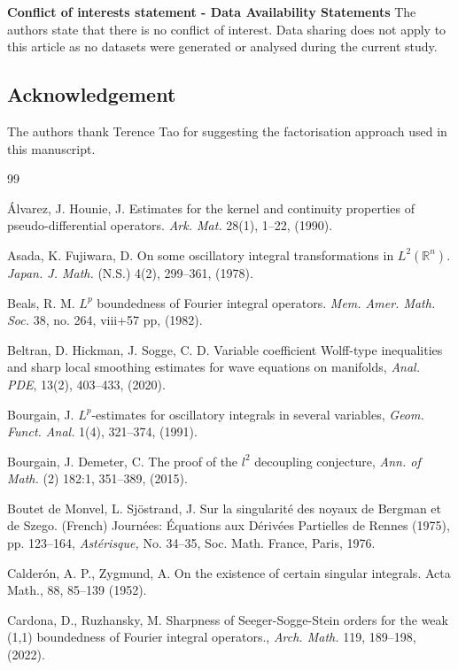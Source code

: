 \documentclass[12pt, reqno]{amsart}
\theoremstyle{definition}
\theoremstyle{remark}
\numberwithin{equation}{section}
\begin{document}
\noindent\textbf{Conflict of interests statement - Data Availability Statements}  The authors state that there is no conflict of interest.  Data sharing does not apply to this article as no datasets were generated or
analysed during the current study.
\subsection{Acknowledgement} The authors thank Terence Tao for suggesting the factorisation approach used in this manuscript.





 

 \begin{thebibliography}{99}

  \'Alvarez, J.   Hounie, J. Estimates for the kernel and continuity properties of pseudo-differential operators. {\it Ark. Mat.} 28(1), 1--22, (1990). 

 Asada, K. Fujiwara, D. On some oscillatory integral transformations in $L^2(\mathbb{R}^n).$  {\it Japan. J. Math.} (N.S.) 4(2), 299--361, (1978).

  Beals, R. M. $L^p$ boundedness of Fourier integral operators. {\it Mem. Amer. Math. Soc.} 38, no. 264, viii+57 pp, (1982).

 Beltran, D.  Hickman, J. Sogge, C. D. Variable coefficient Wolff-type inequalities and sharp local smoothing estimates for wave equations on manifolds, {\it Anal. PDE}, 13(2), 403--433, (2020).

 Bourgain, J.  $L^p$-estimates for oscillatory integrals in several variables, {\it Geom. Funct. Anal.} 1(4), 321--374, (1991). 

 Bourgain, J. Demeter, C. The proof of the $l^2$ decoupling conjecture, {\it Ann. of Math.} (2) 182:1, 351--389, (2015). 

 Boutet de Monvel, L. Sj\"ostrand, J.
Sur la singularité des noyaux de Bergman et de Szego. (French) Journées: Équations aux Dérivées Partielles de Rennes (1975), pp. 123--164,
{\it Ast\'erisque,} No. 34--35, Soc. Math. France, Paris, 1976. 

 Calder\'on, A. P., Zygmund, A. On the existence of certain singular integrals. Acta Math., 88, 85--139
(1952). 

 Cardona, D., Ruzhansky, M.  Sharpness of Seeger-Sogge-Stein orders for the weak (1,1) boundedness of Fourier integral operators.,  {\it Arch. Math.} 119, 189--198, (2022).  


\end{thebibliography}
\end{document}
